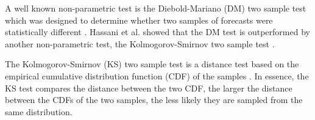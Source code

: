 A well known non-parametric test is the Diebold-Mariano (DM) two sample test which was designed to determine whether two samples of forecasts were statistically different \cite{diebold2015comparing}. Hassani et al. showed that the DM test is outperformed by another non-parametric test, the Kolmogorov-Smirnov two sample test \cite{hassani2015kolmogorov}.

The Kolmogorov-Smirnov (KS) two sample test is a distance test based on the empirical cumulative distribution function (CDF) of the samples \cite{massey1951kolmogorov}. In essence, the KS test compares the distance between the two CDF, the larger the distance between the CDFs of the two samples, the less likely they are sampled from the same distribution.
